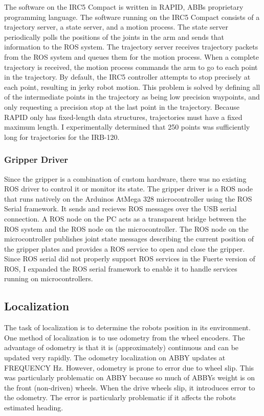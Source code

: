 \documentclass{cwru}
\begin{document}
The software on the IRC5 Compact is written in RAPID, ABB{\textquotesingle}s proprietary programming language. The software running on the IRC5 Compact consists of a trajectory server, a state server, and a motion process. The state server periodically polls the positions of the joints in the arm and sends that information to the ROS system. The trajectory server receives trajectory packets from the ROS system and queues them for the motion process. When a complete trajectory is received, the motion process commands the arm to go to each point in the trajectory. By default, the IRC5 controller attempts to stop precisely at each point, resulting in jerky robot motion. This problem is solved by defining all of the intermediate points in the trajectory as being low precision waypoints, and only requesting a precision stop at the last point in the trajectory. Because RAPID only has fixed-length data structures, trajectories must have a fixed maximum length. I experimentally determined that 250 points was sufficiently long for trajectories for the IRB-120.

\subsubsection{Gripper Driver}
Since the gripper is a combination of custom hardware, there was no existing ROS driver to control it or monitor its state. The gripper driver is a ROS node that runs natively on the Arduino{\textquotesingle}s AtMega 328 microcontroller using the ROS Serial framework. It sends and recieves ROS messages over the USB serial connection. A ROS node on the PC acts as a transparent bridge between the ROS system and the ROS node on the microcontroller. The ROS node on the microcontroller publishes joint state messages describing the current position of the gripper plates and provides a ROS service to open and close the gripper. Since ROS serial did not properly support ROS services in the Fuerte version of ROS, I expanded the ROS serial framework to enable it to handle services running on microcontrollers.

\subsection[Localization]{Localization}
The task of localization is to determine the robot{\textquotesingle}s position in its environment. One method of localization is to use odometry from the wheel encoders. The advantage of odometry is that it is (approximately) continuous and can be updated very rapidly. The odometry localization on ABBY updates at FREQUENCY Hz. However, odometry is prone to error due to wheel slip. This was particularly problematic on ABBY because so much of ABBY{\textquotesingle}s weight is on the front (non-driven) wheels. When the drive wheels slip, it introduces error to the odometry. The error is particularly problematic if it affects the robot{\textquotesingle}s estimated heading.
\end{document}
